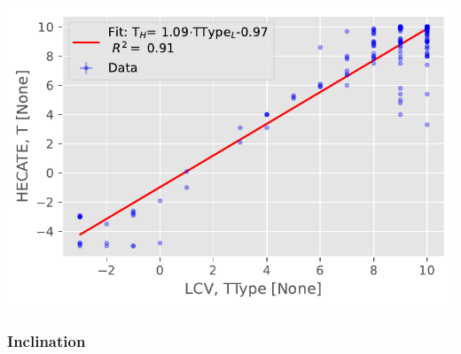 \documentclass[
]{article}
\begin{document}
\includegraphics{compare_files/figure-pdf/cell-23-output-1.pdf}

\subsubsection{Inclination}
\end{document}
